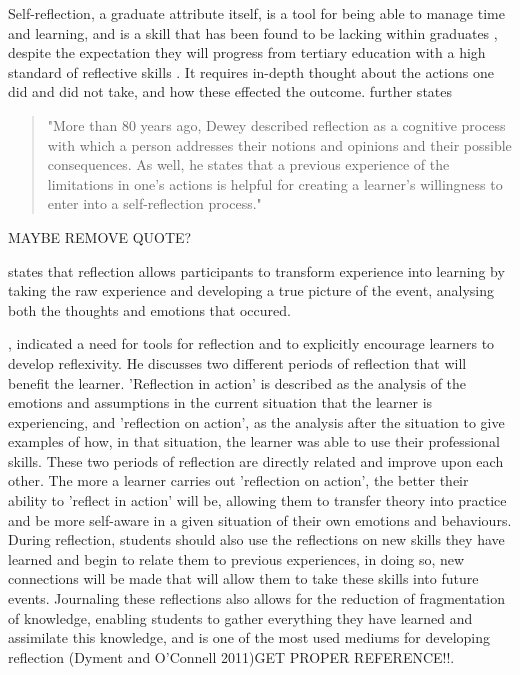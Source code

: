 \documentclass{l4proj}
\begin{document}
Self-reflection, a graduate attribute itself, is a tool for being able to manage time and learning, and is a skill that has been found to be lacking within graduates \citep{thurner_development_2020}, despite the expectation they will progress from tertiary education with a high standard of reflective skills \citep{bruno_reflective_2018}. It requires in-depth thought about the actions one did and did not take, and how these effected the outcome. 
\citet{thurner_development_2020} further states 
\begin{quotation}
    "More than 80 years ago, Dewey described reflection as a cognitive process with which a person addresses their notions and opinions and their 
    possible consequences. As well, he states that a previous experience of the limitations in one’s actions is helpful for creating a learner’s 
    willingness to enter into a self-reflection process."
\end{quotation}
MAYBE REMOVE QUOTE?

\citet{boud_using_2001} states that reflection allows participants to transform experience into learning by taking the raw experience and developing a true picture of the event, analysing both the thoughts and emotions that occured. 

\citet{schon_reflective_1984}, indicated a need for tools for reflection and to explicitly encourage learners to develop reflexivity. He discusses two different periods of reflection that will benefit the learner. 'Reflection in action' is described as the analysis of the emotions and assumptions in the current situation that the learner is experiencing, and 'reflection on action', as the analysis after the situation to give examples of how, in that situation, the learner was able to use their professional skills. These two periods of reflection are directly related and improve upon each other. The more a learner carries out 'reflection on action', the better their ability to 'reflect in action' will be, allowing them to transfer theory into practice and be more self-aware in a given situation of their own emotions and behaviours. During reflection, students should also use the reflections on new skills they have learned and begin to relate them to previous experiences, in doing so, new connections will be made that will allow them to take these skills into future events. Journaling these reflections also allows for the reduction of fragmentation of knowledge, enabling students to gather everything they have learned and assimilate this knowledge, and is one of the most used mediums for developing reflection (Dyment and O'Connell 2011)GET PROPER REFERENCE!!.
\end{document}
